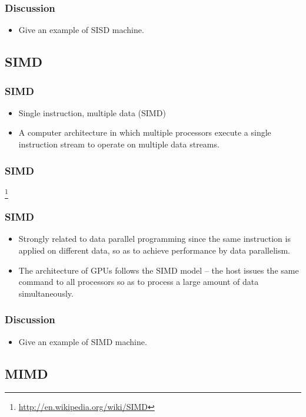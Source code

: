 \documentclass{beamer}
\begin{document}
\begin{CJK}{UTF8}{bsmi}
\begin{frame}
\frametitle{Discussion}
\begin{itemize}
\item Give an example of SISD machine.
\end{itemize}
\end{frame}

\subsection{SIMD}

\begin{frame}
\frametitle{SIMD}
\begin{itemize}
\item Single instruction, multiple data (SIMD) 
\item A computer architecture in which multiple processors execute a
  single instruction stream to operate on multiple data streams.
\end{itemize}
\end{frame}

\begin{frame}
\frametitle{SIMD}
\centerline{}
\footnote{\url{http://en.wikipedia.org/wiki/SIMD}}
\end{frame}

\begin{frame}
\frametitle{SIMD}
\begin{itemize}
\item Strongly related to data parallel programming since the same
  instruction is applied on different data, so as to achieve
  performance by data parallelism.
\item The architecture of GPUs follows the SIMD model -- the host
  issues the same command to all processors so as to process a large
  amount of data simultaneously.
\end{itemize}
\end{frame}

\begin{frame}
\frametitle{Discussion}
\begin{itemize}
\item Give an example of SIMD machine.
\end{itemize}
\end{frame}


\subsection{MIMD}


\end{CJK}
\end{document}

